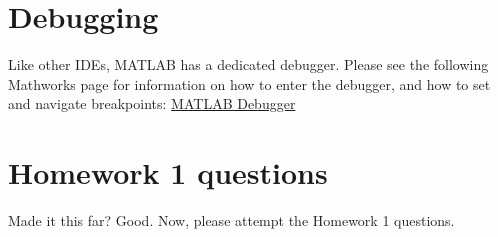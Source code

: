 \documentclass{article}
\begin{document}
\section{Debugging}
\label{sec:debugger}

Like other IDEs, MATLAB has a dedicated debugger. Please see the following Mathworks page for information on how to enter the debugger, and how to set and navigate breakpoints:
\href{https://www.mathworks.com/help/matlab/matlab_prog/debugging-process-and-features.html}{MATLAB Debugger}


\section{Homework 1 questions}
Made it this far? Good. Now, please attempt the Homework 1 questions.
\end{document}
